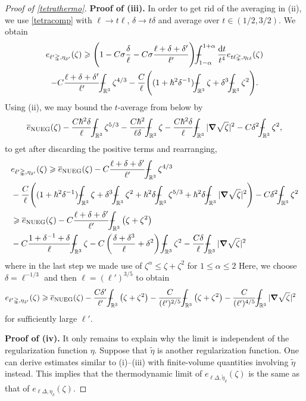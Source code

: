 \documentclass[10pt,a4paper]{amsart}
\newcommand{\NUEG}{\mathrm{NUEG}} %
\newcommand{\RR}{\mathbb{R}}
\def\XXint#1#2#3{{\setbox0=\hbox{$#1{#2#3}{\int}$ }
\vcenter{\hbox{$#2#3$ }}\kern-.6\wd0}}
\def\Xint#1{\mathchoice
{\XXint\displaystyle\textstyle{#1}}%
{\XXint\textstyle\scriptstyle{#1}}%
{\XXint\scriptstyle\scriptscriptstyle{#1}}%
{\XXint\scriptscriptstyle\scriptscriptstyle{#1}}%
\!\int}
\def\dashint{\Xint-}
\newcommand{\dd}{\mathrm{d}} %
\renewcommand{\ge}{\geqslant}
\newcommand{\grad}{\bm{\nabla}} %
\renewcommand{\le}{\leqslant}
\newcommand{\ol}[1]{\overline{#1}}
\newcommand{\tetra}{\mathbb{\Delta}} %
\newcommand{\wt}[1]{\widetilde{#1}}
\begin{document}
\begin{proof}[Proof of \cref{tetrathermo}]
\vspace{.3em}
\noindent\textbf{Proof of (iii).} In order to get rid of the averaging in (ii), we use \cref{tetracomp} with $\ell\to t\ell$, $\delta\to t\delta$ and average over $t\in(1/2,3/2)$. We obtain
\begin{multline}\label{monoavg}
e_{\ell'\tetra,\eta_{\delta'}}(\zeta)\ge \Bigg( 1-C\sigma \frac{\delta}{\ell} -C\sigma\frac{\ell+\delta+\delta'}{\ell'}\Bigg) \dashint_{1-\alpha}^{1+\alpha}\frac{\dd t}{t^4} e_{t\ell\tetra,\eta_{t\delta}}(\zeta)\\
- C \frac{\ell+\delta+\delta'}{\ell'} \dashint_{\RR^3} \zeta^{4/3}-\frac{C}{\ell}\Bigg( (1+\hbar^2\delta^{-1}) \dashint_{\RR^3} \zeta + \delta^3\dashint_{\RR^3} \zeta^2 \Bigg).
\end{multline}
Using (ii), we may bound the $t$-average from below by 
$$
\ol{e}_{\NUEG}(\zeta) -\frac{C\hbar^2\delta}{\ell} \dashint_{\RR^3}\zeta^{5/3} -  \frac{C\hbar^2}{\ell\delta} \dashint_{\RR^3} \zeta - \frac{C\hbar^2\delta}{\ell}\dashint_{\RR^3} |\grad\sqrt{\zeta}|^2 -C\delta^2\dashint_{\RR^3}\zeta^2,
$$
to get after discarding the positive terms and rearranging,
\begin{align*}
&e_{\ell'\tetra,\eta_{\delta'}}(\zeta)\ge \ol{e}_{\NUEG}(\zeta) - C\frac{\ell+\delta+\delta'}{\ell'} \dashint_{\RR^3} \zeta^{4/3} \\
&-\frac{C}{\ell}\Biggl( (1+\hbar^2\delta^{-1}) \dashint_{\RR^3} \zeta + \delta^3\dashint_{\RR^3} \zeta^2 + \hbar^2\delta \dashint_{\RR^3} \zeta^{5/3} + \hbar^2\delta \dashint_{\RR^3} |\grad\sqrt{\zeta}|^2\Biggr) - C\delta^2 \dashint_{\RR^3}\zeta^2  \\
&\ge \ol{e}_{\NUEG}(\zeta) - C\frac{\ell+\delta+\delta'}{\ell'} \dashint_{\RR^3} \left(\zeta +\zeta^2\right) \\
&-C\frac{1+\delta^{-1}+\delta}{\ell} \dashint_{\RR^3} \zeta - C\left(\frac{\delta+\delta^3}{\ell}+\delta^2 \right)\dashint_{\RR^3} \zeta^2  -\frac{C\delta}{\ell} \dashint_{\RR^3} |\grad\sqrt{\zeta}|^2
\end{align*}
where in the last step we made use of $\zeta^\alpha\le \zeta+\zeta^2$ for $1\le\alpha\le 2$
Here, we choose $\delta=\ell^{-1/3}$ and then $\ell=(\ell')^{3/5}$ to obtain
\begin{align*}
&e_{\ell'\tetra,\eta_{\delta'}}(\zeta)\ge \ol{e}_{\NUEG}(\zeta) -\frac{C\delta'}{\ell'}\dashint_{\RR^3} \left(\zeta +\zeta^2\right) -\frac{C}{(\ell')^{2/5}}\dashint_{\RR^3} \left(\zeta +\zeta^2\right) - \frac{C}{(\ell')^{4/5}}\dashint_{\RR^3} |\grad\sqrt{\zeta}|^2
\end{align*}
for sufficiently large $\ell'$.

\vspace{.3em}
\noindent\textbf{Proof of (iv).} It only remains to explain why the limit is independent of the
regularization function $\eta$. Suppose that $\wt{\eta}$ is another regularization function. 
One can derive estimates similar to (i)--(iii) with finite-volume quantities involving $\wt{\eta}$ instead.
 This implies that the thermodynamic limit of $e_{\ell\tetra,\wt{\eta}_\delta}(\zeta)$ is the same as that of $e_{\ell\tetra,\eta_\delta}(\zeta)$.
\end{proof}
\end{document}
